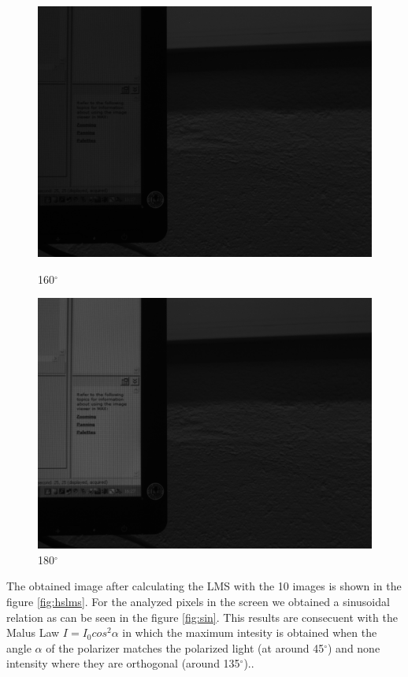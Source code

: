 \documentclass{article}
\begin{document}
\begin{figure}[H]
\begin{minipage}[b]{0.16\linewidth}
\includegraphics[width=1.0\textwidth,natwidth=100,natheight=100]{../LMS/im160.png}
  \caption{160$^\circ$}
  \label{fig:lms11-9}
\end{minipage}
\quad
\begin{minipage}[b]{0.16\linewidth}
\includegraphics[width=1.0\textwidth,natwidth=100,natheight=100]{../LMS/im180.png}
  \caption{180$^\circ$}
  \label{fig:lms11-10}
\end{minipage}
\end{figure}

The obtained image after calculating the LMS with the 10 images is shown in the figure 
\ref{fig:hslms}.
For the analyzed pixels in the screen we obtained a sinusoidal relation as
can be seen in the figure \ref{fig:sin}.
This results are consecuent with the Malus Law $I=I_0 cos^2\alpha$ in which the
maximum intesity is obtained when the angle $\alpha$ of the polarizer matches 
the polarized light (at around 45$^\circ$) and none intensity where they are orthogonal
(around 135$^\circ$)..
\end{document}
